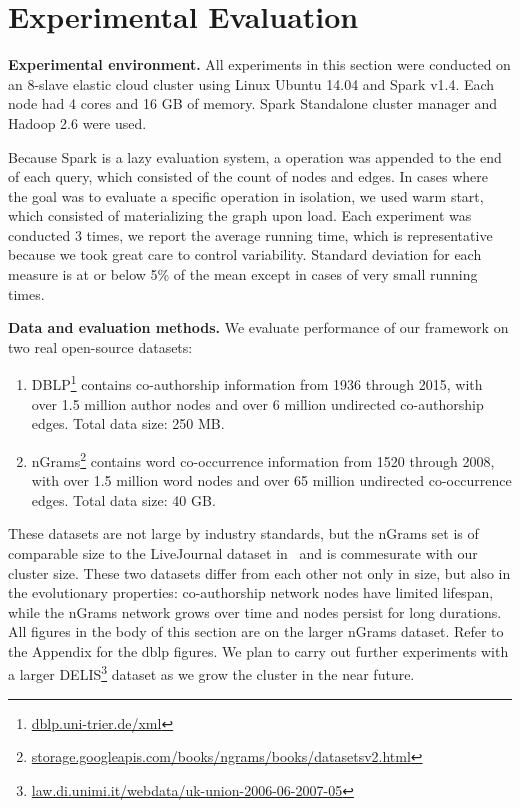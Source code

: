 \section{Experimental Evaluation}
\label{sec:exp}

{\bf Experimental environment.} All experiments in this section were
conducted on an 8-slave elastic cloud cluster using Linux Ubuntu 14.04
and Spark v1.4.  Each node had 4 cores and 16 GB of memory.  Spark
Standalone cluster manager and Hadoop 2.6 were used.

Because Spark is a lazy evaluation system, a 
operation was appended to the end of each query, which consisted of
the count of nodes and edges.  In cases where the goal was to evaluate
a specific operation in isolation, we used warm start, which consisted
of materializing the graph upon load.  Each experiment was conducted 3
times, we report the average running time, which is representative
because we took great care to control variability.  Standard deviation
for each measure is at or below 5\% of the mean except in cases of
very small running times.

{\bf Data and evaluation methods.}  We evaluate performance of our
framework on two real open-source datasets:

\begin{enumerate}%

\item DBLP\footnote{\url{dblp.uni-trier.de/xml}} contains
  co-authorship information from 1936 \linebreak through 2015, with over 1.5
  million author nodes and over 6 million undirected co-authorship
  edges.  Total data size: 250 MB.

\item nGrams\footnote{\url{storage.googleapis.com/books/ngrams/books/datasetsv2.html}}
  contains word co-occurrence information from 1520 through 2008, with
  over 1.5 million word nodes and over 65 million undirected
  co-occurrence edges.  Total data size: 40 GB.
\end{enumerate}

These datasets are not large by industry standards, but the nGrams set
is of comparable size to the LiveJournal dataset in~\cite{Xin2013} and
is commesurate with our cluster size.  These two datasets differ from
each other not only in size, but also in the evolutionary properties:
co-authorship network nodes have limited lifespan, while the nGrams
network grows over time and nodes persist for long durations.  All
figures in the body of this section are on the larger nGrams dataset.
Refer to the Appendix for the dblp figures.  We plan to carry out
further experiments with a larger
DELIS\footnote{\url{law.di.unimi.it/webdata/uk-union-2006-06-2007-05}}
dataset as we grow the cluster in the near future.

